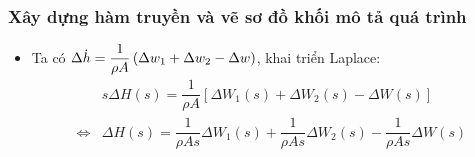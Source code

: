 \subsubsection{Xây dựng hàm truyền và vẽ sơ đồ khối mô tả quá trình}
    \begin{itemize}
        \item Ta có $\Delta \dot{h} = \dfrac{1}{\rho A} \left({\Delta w_1 + \Delta w_2 - \Delta w}\right)$, khai triển Laplace:
            \begin{align*}
                & s \Delta H(s) = \dfrac{1}{\rho A} \left[{\Delta W_1(s) + \Delta W_2(s) - \Delta W(s)}\right]\\
                \Longleftrightarrow & \Delta H(s) = \dfrac{1}{\rho As} \Delta W_1(s) + \dfrac{1}{\rho As} \Delta W_2(s) - \dfrac{1}{\rho As} \Delta W(s)
            \end{align*}


\end{itemize}
